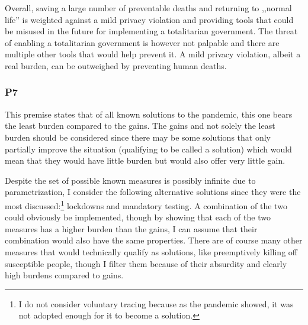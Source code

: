 Overall, saving a large number of preventable deaths and returning to ,,normal life'' is weighted against a mild privacy violation and providing tools that could be misused in the future for implementing a totalitarian government.
The threat of enabling a totalitarian government is however not palpable and there are multiple other tools that would help prevent it.
A mild privacy violation, albeit a real burden, can be outweighed by preventing human deaths.

\subsubsection*{P7}

This premise states that of all known solutions to the pandemic, this one bears the least burden compared to the gains.
The gains and not solely the least burden should be considered since there may be some solutions that only partially improve the situation (qualifying to be called a solution) which would mean that they would have little burden but would also offer very little gain.


Despite the set of possible known measures is possibly infinite due to parametrization, I consider the following alternative solutions since they were the most discussed:\footnote{I do not consider voluntary tracing because as the pandemic showed, it was not adopted enough for it to become a solution.} lockdowns and mandatory testing.
A combination of the two could obviously be implemented, though by showing that each of the two measures has a higher burden than the gains, I can assume that their combination would also have the same properties.
There are of course many other measures that would technically qualify as solutions, like preemptively killing off susceptible people, though I filter them because of their absurdity and clearly high burdens compared to gains.

